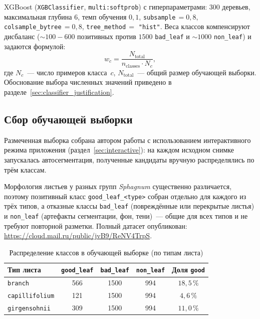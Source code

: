 XGBoost (\texttt{XGBClassifier}, \texttt{multi:softprob}) с гиперпараметрами:
$300$ деревьев, максимальная глубина $6$, темп обучения $0{,}1$,
\texttt{subsample}$\,= 0{,}8$, \texttt{colsample\_bytree}$\,= 0{,}8$,
\texttt{tree\_method}$\,=$ \texttt{"hist"}. Веса классов компенсируют
дисбаланс ($\sim 100\!-\!600$ позитивных против $1500$ \texttt{bad\_leaf} и
$\sim 1000$ \texttt{non\_leaf}) и задаются формулой:
\begin{equation}
    w_c = \frac{N_{\text{total}}}{n_{\text{classes}} \cdot N_c},
    \label{eq:class_weights}
\end{equation}
где $N_c$~--- число примеров класса~$c$, $N_{\text{total}}$~--- общий размер
обучающей выборки. Обоснование выбора численных значений приведено в
разделе~\ref{sec:classifier_justification}.

\subsection{Сбор обучающей выборки}
\label{sec:classifier_dataset}

Размеченная выборка собрана автором работы с использованием интерактивного
режима приложения (раздел~\ref{sec:interactive}): на каждом исходном снимке
запускалась автосегментация, полученные кандидаты вручную распределялись по
трём классам.

Морфология листьев у разных групп \textit{Sphagnum} существенно различается, поэтому
позитивный класс \texttt{good\_leaf\_<type>} собран отдельно для каждого из
трёх типов, а отказные классы \texttt{bad\_leaf} (повреждённые или перекрытые
листья) и \texttt{non\_leaf} (артефакты сегментации, фон, тени)~--- общие для
всех типов и не требуют повторной разметки. Полный датасет
опубликован: \url{https://cloud.mail.ru/public/jvB9/ReNV4TrpS}.

\begin{table}[H]
\centering
\caption{Распределение классов в обучающей выборке (по типам листа)}
\label{tab:clf_balance}
\small
\begin{tabular}{lcccc}
\hline
\textbf{Тип листа} & \texttt{good\_leaf} & \texttt{bad\_leaf} & \texttt{non\_leaf} & \textbf{Доля \texttt{good}} \\
\hline
\texttt{branch}        & 566  & 1500 & 994  & $18{,}5\,\%$ \\
\texttt{capillifolium} & 121  & 1500 & 994  & $4{,}6\,\%$  \\
\texttt{girgensohnii}  & 309  & 1500 & 994  & $11{,}0\,\%$ \\
\hline
\end{tabular}
\end{table}

